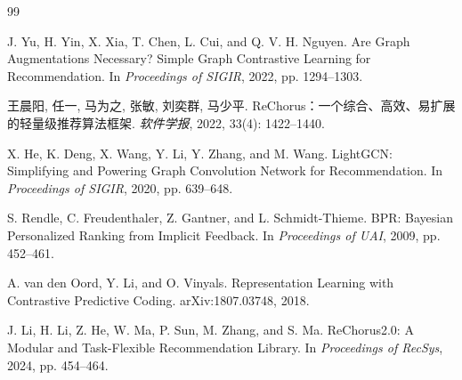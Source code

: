 \documentclass[UTF8,a4paper,12pt]{ctexart}
\begin{document}
\begin{thebibliography}{99}

J. Yu, H. Yin, X. Xia, T. Chen, L. Cui, and Q. V. H. Nguyen.
\newblock Are Graph Augmentations Necessary? Simple Graph Contrastive Learning for Recommendation.
\newblock In \emph{Proceedings of SIGIR}, 2022, pp. 1294--1303.

王晨阳, 任一, 马为之, 张敏, 刘奕群, 马少平.
\newblock ReChorus：一个综合、高效、易扩展的轻量级推荐算法框架.
\newblock \emph{软件学报}, 2022, 33(4): 1422--1440.

X. He, K. Deng, X. Wang, Y. Li, Y. Zhang, and M. Wang.
\newblock LightGCN: Simplifying and Powering Graph Convolution Network for Recommendation.
\newblock In \emph{Proceedings of SIGIR}, 2020, pp. 639--648.

S. Rendle, C. Freudenthaler, Z. Gantner, and L. Schmidt-Thieme.
\newblock BPR: Bayesian Personalized Ranking from Implicit Feedback.
\newblock In \emph{Proceedings of UAI}, 2009, pp. 452--461.

A. van den Oord, Y. Li, and O. Vinyals.
\newblock Representation Learning with Contrastive Predictive Coding.
\newblock arXiv:1807.03748, 2018.

J. Li, H. Li, Z. He, W. Ma, P. Sun, M. Zhang, and S. Ma.
\newblock ReChorus2.0: A Modular and Task-Flexible Recommendation Library.
\newblock In \emph{Proceedings of RecSys}, 2024, pp. 454--464.

\end{thebibliography}
\end{document}
